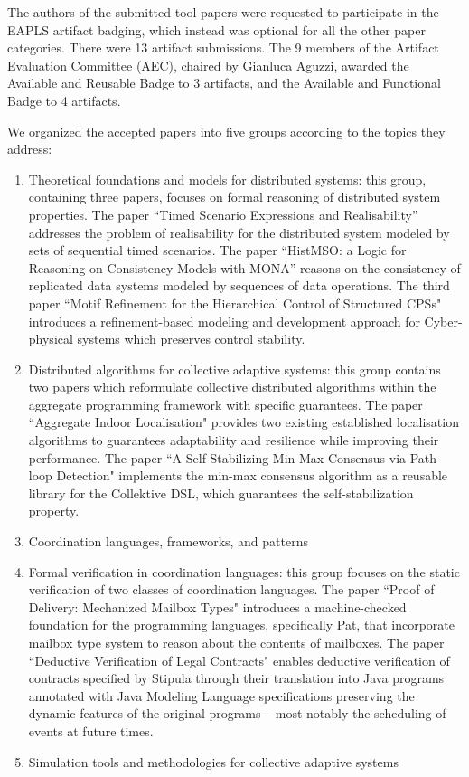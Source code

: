 \documentclass[runningheads]{llncs}
\begin{document}
The authors of the submitted tool papers were requested to participate in the EAPLS
artifact badging, which instead was optional for all the other paper categories. There
were 13 artifact submissions. The 9 members of the Artifact Evaluation Committee
(AEC), chaired by Gianluca Aguzzi, awarded the Available and Reusable Badge to 3
artifacts, and the Available and Functional Badge to 4 artifacts.


We organized the accepted papers into five groups according to the topics they address:\begin{enumerate}
	\item Theoretical foundations and models for distributed systems: this group, containing three papers, focuses on formal reasoning of distributed system properties. The paper ``Timed Scenario Expressions and Realisability''  addresses the problem of realisability for the distributed system modeled by sets of sequential timed scenarios.  The paper ``HistMSO: a Logic for Reasoning on Consistency Models with MONA'' reasons on the consistency of replicated data systems modeled by sequences of data operations. The third paper ``Motif Refinement for the Hierarchical Control of Structured CPSs" introduces a refinement-based modeling and development approach for Cyber-physical systems which preserves control stability.  
	\item Distributed algorithms for collective adaptive systems: this group contains two papers which reformulate collective distributed algorithms within the aggregate programming framework with specific guarantees. The paper ``Aggregate Indoor Localisation" provides two existing established localisation algorithms to guarantees  adaptability and resilience while improving their performance. The paper ``A Self-Stabilizing Min-Max Consensus via Path-loop Detection" implements the min-max consensus algorithm as a
	reusable library for the Collektive DSL, which guarantees the self-stabilization property. 
	\item Coordination languages, frameworks, and patterns
	\item Formal verification in coordination languages: this group focuses on the static verification of two classes of coordination languages. The paper ``Proof of Delivery: Mechanized Mailbox Types" introduces a machine-checked foundation for the programming languages, specifically Pat, that incorporate mailbox type system to reason about the contents of mailboxes. The paper ``Deductive Verification of Legal Contracts" enables deductive verification of contracts specified by Stipula through their translation into Java programs annotated with Java 
	Modeling Language specifications preserving the dynamic
	features of the original programs – most notably the scheduling of events at future times.
	\item Simulation tools and methodologies for collective adaptive systems
\end{enumerate} 
\end{document}
